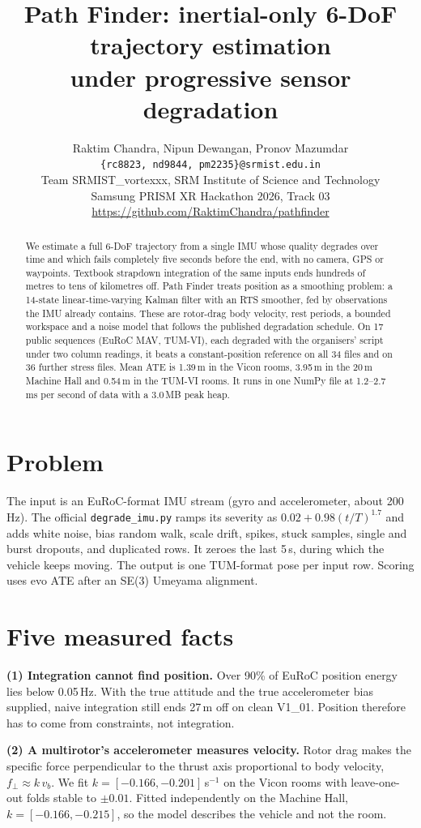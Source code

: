 \documentclass[10pt,a4paper,twocolumn]{article}
\title{\vspace{-1.2cm}\textbf{Path Finder: inertial-only 6-DoF trajectory estimation\\under progressive sensor degradation}}
\author{Raktim Chandra, Nipun Dewangan, Pronov Mazumdar\\ \small \texttt{\{rc8823, nd9844, pm2235\}@srmist.edu.in}\\ \small Team SRMIST\_vortexxx, SRM Institute of Science and Technology\\ \small Samsung PRISM XR Hackathon 2026, Track 03 \quad \url{https://github.com/RaktimChandra/pathfinder}}
\date{}
\begin{document}
\maketitle
\begin{abstract}
We estimate a full 6-DoF trajectory from a single IMU whose quality degrades over time and which fails completely five seconds before the end, with no camera, GPS or waypoints. Textbook strapdown integration of the same inputs ends hundreds of metres to tens of kilometres off. Path Finder treats position as a smoothing problem: a 14-state linear-time-varying Kalman filter with an RTS smoother, fed by observations the IMU already contains. These are rotor-drag body velocity, rest periods, a bounded workspace and a noise model that follows the published degradation schedule. On 17 public sequences (EuRoC MAV, TUM-VI), each degraded with the organisers' script under two column readings, it beats a constant-position reference on all 34 files and on 36 further stress files. Mean ATE is 1.39\,m in the Vicon rooms, 3.95\,m in the 20\,m Machine Hall and 0.54\,m in the TUM-VI rooms. It runs in one NumPy file at 1.2--2.7\,ms per second of data with a 3.0\,MB peak heap.
\end{abstract}

\section{Problem}
The input is an EuRoC-format IMU stream (gyro and accelerometer, about 200\,Hz). The official \texttt{degrade\_imu.py} ramps its severity as $0.02+0.98(t/T)^{1.7}$ and adds white noise, bias random walk, scale drift, spikes, stuck samples, single and burst dropouts, and duplicated rows. It zeroes the last 5\,s, during which the vehicle keeps moving. The output is one TUM-format pose per input row. Scoring uses evo ATE after an SE(3) Umeyama alignment.

\section{Five measured facts}
\textbf{(1) Integration cannot find position.} Over 90\% of EuRoC position energy lies below 0.05\,Hz. With the true attitude and the true accelerometer bias supplied, naive integration still ends 27\,m off on clean V1\_01. Position therefore has to come from constraints, not integration.

\textbf{(2) A multirotor's accelerometer measures velocity.} Rotor drag makes the specific force perpendicular to the thrust axis proportional to body velocity, $f_\perp\approx k\,v_b$. We fit $k=[-0.166,-0.201]$\,s$^{-1}$ on the Vicon rooms with leave-one-out folds stable to $\pm0.01$. Fitted independently on the Machine Hall, $k=[-0.166,-0.215]$, so the model describes the vehicle and not the room.
\end{document}
